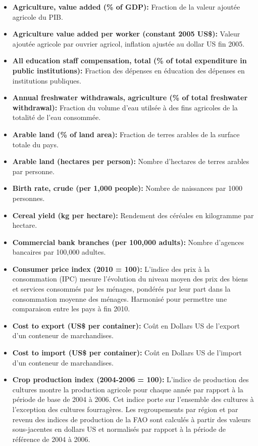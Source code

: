 \begin{itemize}
		\item \textbf{ Agriculture, value added (\% of GDP):} Fraction de la valeur ajoutée agricole du PIB.
		\item \textbf{ Agriculture value added per worker (constant 2005 US\$):} Valeur ajoutée agricole par ouvrier agricol, inflation ajustée au dollar US fin 2005.
		\item \textbf{ All education staff compensation, total (\% of total expenditure in public institutions):} Fraction des dépenses en éducation des dépenses en institutions publiques.
		\item \textbf{ Annual freshwater withdrawals, agriculture (\% of total freshwater withdrawal):} Fraction du volume d'eau utilsée à des fins agricoles de la totalité de l'eau consommée.
		\item \textbf{ Arable land (\% of land area):} Fraction de terres arables de la surface totale du pays.
		\item \textbf{ Arable land (hectares per person):} Nombre d'hectares de terres arables par personne.
		\item \textbf{ Birth rate, crude (per 1,000 people):} Nombre de naissances par 1000 personnes.
		\item \textbf{ Cereal yield (kg per hectare):} Rendement des céréales en kilogramme par hectare.
		\item \textbf{ Commercial bank branches (per 100,000 adults):} Nombre d'agences bancaires par 100,000 adultes.
		\item \textbf{ Consumer price index (2010 = 100):} L'indice des prix à la consommation (IPC) mesure l'évolution du niveau moyen des prix des biens et services consommés par les ménages, pondérés par leur part dans la consommation moyenne des ménages. Harmonisé pour permettre une comparaison entre les pays à fin 2010.
		\item \textbf{ Cost to export (US\$ per container):} Coût en Dollars US de l'export d'un conteneur de marchandises.
		\item \textbf{ Cost to import (US\$ per container):} Coût en Dollars US de l'import d'un conteneur de marchandises.
		\item \textbf{ Crop production index (2004-2006 = 100):} 
		L'indice de production des cultures montre la production agricole pour chaque année par rapport à la période de base de 2004 à 2006. Cet indice porte sur l'ensemble des cultures à l'exception des cultures fourragères. Les regroupements par région et par revenu des indices de production de la FAO sont calculés à partir des valeurs sous-jacentes en dollars US et normalisés par rapport à la période de référence de 2004 à 2006.

\end{itemize}
